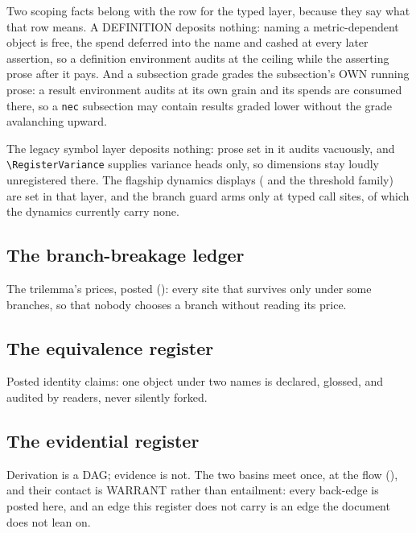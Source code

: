 \documentclass[../main]{subfiles}
\begin{document}
Two scoping facts belong with the row for the typed layer, because they say what
that row means. A DEFINITION deposits nothing: naming a metric-dependent object is
free, the spend deferred into the name and cashed at every later assertion, so a
definition environment audits at the ceiling while the asserting prose after it pays.
And a subsection grade grades the subsection's OWN running prose: a result environment
audits at its own grain and its spends are consumed there, so a \texttt{nec} subsection
may contain results graded lower without the grade avalanching upward.

The legacy symbol layer deposits nothing: prose set in it audits vacuously, and
\verb|\RegisterVariance| supplies variance heads only, so dimensions stay loudly
unregistered there. The flagship dynamics displays ( and the
threshold family) are set in that layer, and the branch guard arms only at typed
call sites, of which the dynamics currently carry none.

\subsection{The branch-breakage ledger}
\label{subsec:ledger:branches}
The trilemma's prices, posted (): every site that survives only under some
branches, so that nobody chooses a branch without reading its price.

\GenerateBranchLedger

\subsection{The equivalence register}
\label{subsec:ledger:equiv}
Posted identity claims: one object under two names is declared, glossed, and audited by
readers, never silently forked.

\GenerateEquivalences

\subsection{The evidential register}
\label{subsec:ledger:evidence}
Derivation is a DAG; evidence is not. The two basins meet once, at the flow
(), and their contact is WARRANT rather than entailment: every
back-edge is posted here, and an edge this register does not carry is an edge the
document does not lean on.

\GenerateEvidence
\end{document}
